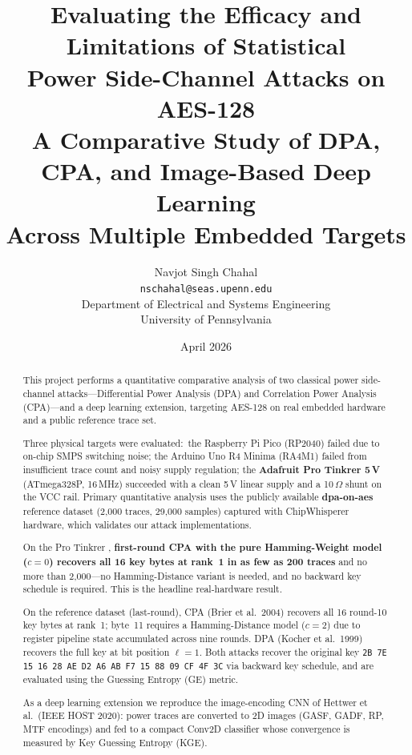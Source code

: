 \documentclass[11pt]{article}
\title{
  \textbf{Evaluating the Efficacy and Limitations of Statistical \\
  Power Side-Channel Attacks on AES-128} \\[4pt]
  \large A Comparative Study of DPA, CPA, and Image-Based Deep Learning \\
  Across Multiple Embedded Targets
}
\author{
  Navjot Singh Chahal \\
  \texttt{nschahal@seas.upenn.edu} \\[4pt]
  Department of Electrical and Systems Engineering \\
  University of Pennsylvania
}
\date{April 2026}
\begin{document}
\maketitle
\thispagestyle{fancy}

\begin{abstract}
This project performs a quantitative comparative analysis of two classical
power side-channel attacks---Differential Power Analysis (DPA) and Correlation
Power Analysis (CPA)---and a deep learning extension, targeting AES-128 on
real embedded hardware and a public reference trace set.

Three physical targets were evaluated:\ the Raspberry Pi Pico (RP2040)
failed due to on-chip SMPS switching noise; the Arduino Uno R4 Minima
(RA4M1) failed from insufficient trace count and noisy supply regulation;
the \textbf{Adafruit Pro Tinkrer 5\,V} (ATmega328P, 16\,MHz) succeeded with
a clean 5\,V linear supply and a 10\,$\Omega$ shunt on the VCC rail.
Primary quantitative analysis uses the publicly available \textbf{dpa-on-aes}
reference dataset (2{,}000 traces, 29{,}000 samples) captured with
ChipWhisperer hardware, which validates our attack implementations.

On the Pro Tinkrer , \textbf{first-round CPA with the pure Hamming-Weight
model ($c=0$) recovers all 16 key bytes at rank~1 in as few as 200 traces}
and no more than 2{,}000---no Hamming-Distance variant is needed, and no
backward key schedule is required.
This is the headline real-hardware result.

On the reference dataset (last-round), CPA (Brier et al.\ 2004) recovers
all 16 round-10 key bytes at rank~1; byte~11 requires a Hamming-Distance
model ($c=2$) due to register pipeline state accumulated across nine rounds.
DPA (Kocher et al.\ 1999) recovers the full key at bit position $\ell=1$.
Both attacks recover the original key
\texttt{2B 7E 15 16 28 AE D2 A6 AB F7 15 88 09 CF 4F 3C} via backward key
schedule, and are evaluated using the Guessing Entropy (GE) metric.

As a deep learning extension we reproduce the image-encoding CNN of
Hettwer et al.\ (IEEE HOST 2020): power traces are converted to
2D images (GASF, GADF, RP, MTF encodings) and fed to a compact Conv2D
classifier whose convergence is measured by Key Guessing Entropy (KGE).
\end{abstract}

\tableofcontents
\newpage












\appendix


\end{document}
